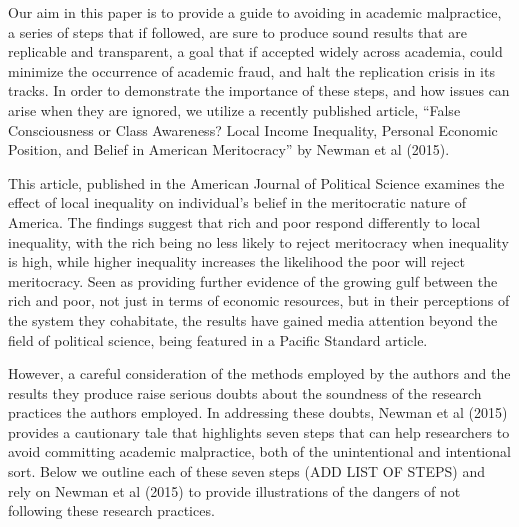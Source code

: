 Our aim in this paper is to provide a guide to avoiding in academic malpractice, a series of steps that if followed, are sure to produce sound results that are replicable and transparent, a goal that if accepted widely across academia, could minimize the occurrence of academic fraud, and halt the replication crisis in its tracks. In order to demonstrate the importance of these steps, and how issues can arise when they are ignored, we utilize a recently published article, “False Consciousness or Class Awareness? Local Income Inequality, Personal Economic Position, and Belief in American Meritocracy” by Newman et al (2015).

This article, published in the American Journal of Political Science examines the effect of local inequality on individual’s belief in the meritocratic nature of America. The findings suggest that rich and poor respond differently to local inequality, with the rich being no less likely to reject meritocracy when inequality is high, while higher inequality increases the likelihood the poor will reject meritocracy. Seen as providing further evidence of the growing gulf between the rich and poor, not just in terms of economic resources, but in their perceptions of the system they cohabitate, the results have gained media attention beyond the field of political science, being featured in a Pacific Standard article.

However, a careful consideration of the methods employed by the authors and the results they produce raise serious doubts about the soundness of the research practices the authors employed. In addressing these doubts, Newman et al (2015) provides a cautionary tale that highlights seven steps that can help researchers to avoid committing academic malpractice, both of the unintentional and intentional sort. Below we outline each of these seven steps (ADD LIST OF STEPS) and rely on Newman et al (2015) to provide illustrations of the dangers of not following these research practices.




